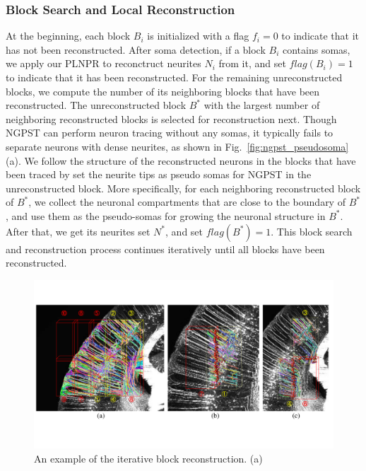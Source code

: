 \subsubsection{Block Search and Local Reconstruction}
\label{sec:trace}

%
At the beginning, each block $B_{i}$ is initialized with a flag $ f_i = 0$ to indicate that it has not been reconstructed.
%
After soma detection, if a block $ B_{i}$ contains somas, we apply our PLNPR to reconctruct neurites $ N_{i} $ from it, and set $flag(B_{i})= 1 $ to indicate that it has been reconstructed.
%
For the remaining unreconstructed blocks, we compute the number of its neighboring blocks that have been reconstructed. 
The unreconstructed block $B^*$ with the largest number of neighboring reconstructed blocks is selected for reconstruction next.
%
Though NGPST can perform neuron tracing without any somas, it typically fails to separate neurons with dense neurites, as shown in Fig.~\ref{fig:ngpst_pseudosoma}(a).
%
We follow the structure of the reconstructed neurons in the blocks that have been traced by set the neurite tips as pseudo somas for NGPST in the unreconstructed block.
%
More specifically, for each neighboring reconstructed block of $ B^* $, we collect the neuronal compartments that are close to the boundary of $ B^* $, and use them as the pseudo-somas for growing the neuronal structure in $B^*$.
After that, we get its neurites set $ N^* $, and set $ flag(B^*) = 1 $.
%
This block search and reconstruction process continues iteratively until all blocks have been reconstructed.



\begin{figure}[t]
	\centering
	\includegraphics[width=1\textwidth]{./Illustrations/ultranpr_block_search2.pdf}
	\caption{An example of the iterative block reconstruction.  (a) }
	\label{fig:blocksearch}
\end{figure}

